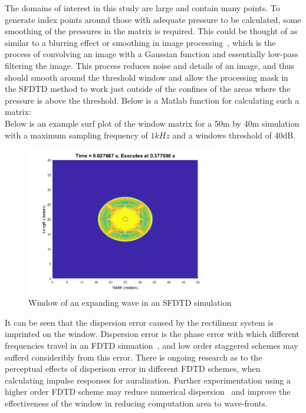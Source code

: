 The domains of interest in this study are large and contain many points. To generate index points around those with adequate pressure to be calculated, some smoothing of the pressures in the matrix is required. This could be thought of as similar to a blurring effect or smoothing in image processing~\cite{Blanchet2006}, which is the process of convolving an image with a Gaussian function and essentially low-pass filtering the image. This process reduces noise and details of an image, and thus should smooth around the threshold window and allow the processing mask in the SFDTD method to work just outside of the confines of the areas where the pressure is above the threshold. Below is a Matlab function for calculating such a matrix:\\



Below is an example surf plot of the window matrix for a 50m by 40m simulation with a maximum sampling frequency of $1kHz$ and a windows threshold of 40dB. 
\begin{figure}[H]
\centering
  \includegraphics[width=0.75\textwidth]{./graphics/Example Window 1.png} %
  \caption{Window of an expanding wave in an SFDTD simulation}
\end{figure}

It can be seen that the dispersion error caused by the rectilinear system is imprinted on the window. Dispersion error is the phase error with which different frequencies travel in an FDTD simuation~\cite{Saarelma2016}, and low order staggered schemes may sufferd consideribly from this error. There is ongoing research as to the perceptual effects of disperison error in different FDTD schemes, when calculating impulse responses for auralization. Further experimentation using a higher order FDTD scheme may reduce numerical dispersion~\cite{Hamilton2013a,VanMourik2014} and improve the effectiveness of the window in reducing computation area to wave-fronts.\\

